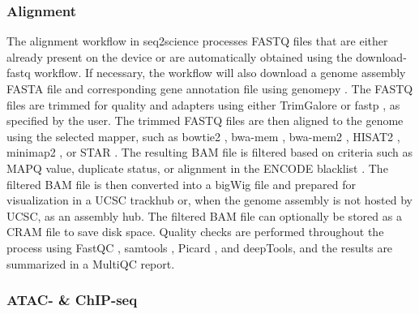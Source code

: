 \subsubsection{Alignment}

The alignment workflow in seq2science processes FASTQ files that are either already present on the device or are automatically obtained using the download-fastq workflow. If necessary, the workflow will also download a genome assembly FASTA file and corresponding gene annotation file using genomepy \cite{genomepy}. The FASTQ files are trimmed for quality and adapters using either TrimGalore \cite{trimgalore} or fastp \cite{fastp}, as specified by the user. The trimmed FASTQ files are then aligned to the genome using the selected mapper, such as bowtie2 \cite{bowtie2}, bwa-mem \cite{bwamem}, bwa-mem2 \cite{bwamem2}, HISAT2 \cite{hisat2}, minimap2 \cite{minimap2}, or STAR \cite{star}. The resulting BAM file is filtered based on criteria such as MAPQ value, duplicate status, or alignment in the ENCODE blacklist \cite{blacklist}. The filtered BAM file is then converted into a bigWig file and prepared for visualization in a UCSC trackhub \cite{trackhub} or, when the genome assembly is not hosted by UCSC, as an assembly hub. The filtered BAM file can optionally be stored as a CRAM file to save disk space. Quality checks are performed throughout the process using FastQC \cite{fastqc}, samtools \cite{samtools}, Picard \cite{picard}, and deepTools\cite{deeptools}, and the results are summarized in a MultiQC report\cite{multiqc}.

\subsubsection{ATAC- \& ChIP-seq}

